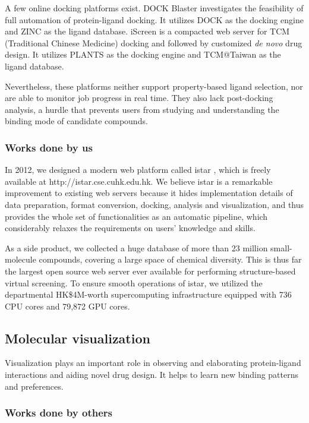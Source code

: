 \documentclass[a4paper,12pt]{article}
\begin{document}
A few online docking platforms exist. DOCK Blaster \cite{557} investigates the feasibility of full automation of protein-ligand docking. It utilizes DOCK \cite{1222} as the docking engine and ZINC \cite{532,1178} as the ligand database. iScreen \cite{899} is a compacted web server for TCM (Traditional Chinese Medicine) docking and followed by customized \textit{de novo} drug design. It utilizes PLANTS \cite{610,607,779} as the docking engine and TCM@Taiwan \cite{528} as the ligand database.

Nevertheless, these platforms neither support property-based ligand selection, nor are able to monitor job progress in real time. They also lack post-docking analysis, a hurdle that prevents users from studying and understanding the binding mode of candidate compounds.

\subsubsection*{Works done by us}

In 2012, we designed a modern web platform called istar \cite{1362}, which is freely available at http://istar.cse.cuhk.edu.hk. We believe istar is a remarkable improvement to existing web servers because it hides implementation details of data preparation, format conversion, docking, analysis and visualization, and thus provides the whole set of functionalities as an automatic pipeline, which considerably relaxes the requirements on users' knowledge and skills.

As a side product, we collected a huge database of more than 23 million small-molecule compounds, covering a large space of chemical diversity. This is thus far the largest open source web server ever available for performing structure-based virtual screening. To ensure smooth operations of istar, we utilized the departmental HK\$4M-worth supercomputing infrastructure equipped with 736 CPU cores and 79,872 GPU cores.

\subsection*{Molecular visualization}

Visualization plays an important role in observing and elaborating protein-ligand interactions and aiding novel drug design. It helps to learn new binding patterns and preferences.

\subsubsection*{Works done by others}
\end{document}
